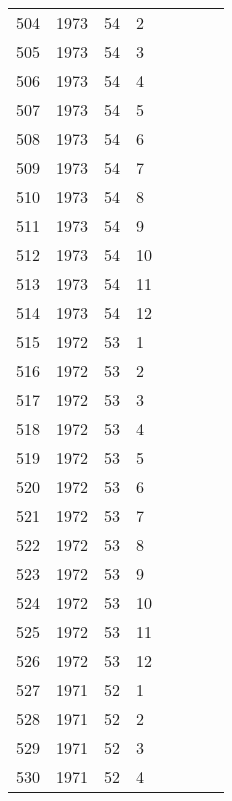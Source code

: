 \begin{longtable}{ |l|l|l|l|l|l|l|l| }
504 & 1973 & 54 &     2 &         &                &  & \\
505 & 1973 & 54 &     3 &         &                &  & \\
506 & 1973 & 54 &     4 &         &                &  & \\
507 & 1973 & 54 &     5 &         &                &  & \\
508 & 1973 & 54 &     6 &         &                &  & \\
509 & 1973 & 54 &     7 &         &                &  & \\
510 & 1973 & 54 &     8 &         &                &  & \\
511 & 1973 & 54 &     9 &         &                &  & \\
512 & 1973 & 54 &    10 &         &                &  & \\
513 & 1973 & 54 &    11 &         &                &  & \\
514 & 1973 & 54 &    12 &         &                &  & \\
515 & 1972 & 53 &     1 &         &                &  & \\
516 & 1972 & 53 &     2 &         &                &  & \\
517 & 1972 & 53 &     3 &         &                &  & \\
518 & 1972 & 53 &     4 &         &                &  & \\
519 & 1972 & 53 &     5 &         &                &  & \\
520 & 1972 & 53 &     6 &         &                &  & \\
521 & 1972 & 53 &     7 &         &                &  & \\
522 & 1972 & 53 &     8 &         &                &  & \\
523 & 1972 & 53 &     9 &         &                &  & \\
524 & 1972 & 53 &    10 &         &                &  & \\
525 & 1972 & 53 &    11 &         &                &  & \\
526 & 1972 & 53 &    12 &         &                &  & \\
527 & 1971 & 52 &     1 &         &                &  & \\
528 & 1971 & 52 &     2 &         &                &  & \\
529 & 1971 & 52 &     3 &         &                &  & \\
530 & 1971 & 52 &     4 &         &                &  & \\

\end{longtable}
